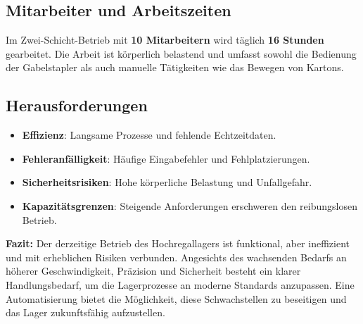 \subsection*{Mitarbeiter und Arbeitszeiten}
Im Zwei-Schicht-Betrieb mit \textbf{10 Mitarbeitern} wird täglich \textbf{16 Stunden} gearbeitet. Die Arbeit ist körperlich belastend und umfasst sowohl die Bedienung der Gabelstapler als auch manuelle Tätigkeiten wie das Bewegen von Kartons.

\subsection*{Herausforderungen}
\begin{itemize}
	\item \textbf{Effizienz}: Langsame Prozesse und fehlende Echtzeitdaten.
	\item \textbf{Fehleranfälligkeit}: Häufige Eingabefehler und Fehlplatzierungen.
	\item \textbf{Sicherheitsrisiken}: Hohe körperliche Belastung und Unfallgefahr.
	\item \textbf{Kapazitätsgrenzen}: Steigende Anforderungen erschweren den reibungslosen Betrieb.
\end{itemize}

\textbf{Fazit:} Der derzeitige Betrieb des Hochregallagers ist funktional, aber ineffizient und mit erheblichen Risiken verbunden. Angesichts des wachsenden Bedarfs an höherer Geschwindigkeit, Präzision und Sicherheit besteht ein klarer Handlungsbedarf, um die Lagerprozesse an moderne Standards anzupassen. Eine Automatisierung bietet die Möglichkeit, diese Schwachstellen zu beseitigen und das Lager zukunftsfähig aufzustellen.
